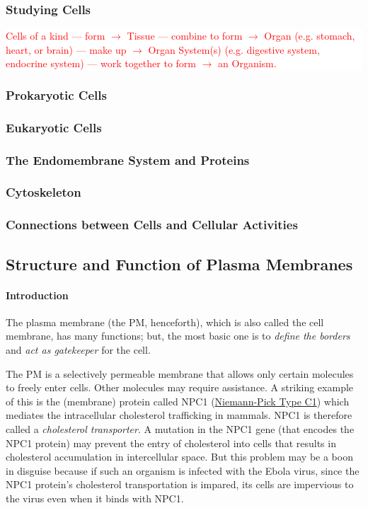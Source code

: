 \documentclass[12pt]{article}
\newcommand{\ctext}[3]{
    \colorbox{#2}{\parbox{0.9\textwidth}{\textcolor{#1}{#3}}}
}
\begin{document}
\subsubsection{Studying Cells}
\ctext{red}{white}{
    Cells of a kind --- form $\rightarrow$ Tissue --- combine to form $\rightarrow$ Organ (e.g. stomach, heart, or brain) --- make up $\rightarrow$ Organ System(s) (e.g. digestive system, endocrine system) --- work together to form $\rightarrow$ an Organism.
}
\subsubsection{Prokaryotic Cells}
\subsubsection{Eukaryotic Cells}
\subsubsection{The Endomembrane System and Proteins}
\subsubsection{Cytoskeleton}
\subsubsection{Connections between Cells and Cellular Activities}


\subsection{Structure and Function of Plasma Membranes}
\paragraph{Introduction}
The plasma membrane (the PM, henceforth), which is also called the cell membrane, has many functions; but, the most basic one is to \emph{define the borders} and \emph{act as gatekeeper} for the cell.

The PM is a selectively permeable membrane that allows only certain molecules to freely enter cells. Other molecules may require assistance. A striking example of this is the (membrane) protein called NPC1 (\href{https://en.wikipedia.org/wiki/NPC1}{Niemann-Pick Type C1}) which mediates the intracellular cholesterol trafficking in mammals. NPC1 is therefore called a \emph{cholesterol transporter}. A mutation in the NPC1 gene (that encodes the NPC1 protein) may prevent the entry of cholesterol into cells that results in cholesterol accumulation in intercellular space. But this problem may be a boon in disguise because if such an organism is infected with the Ebola virus, since the NPC1 protein's cholesterol transportation is impared, its cells are impervious to the virus even when it binds with NPC1.
\end{document}
